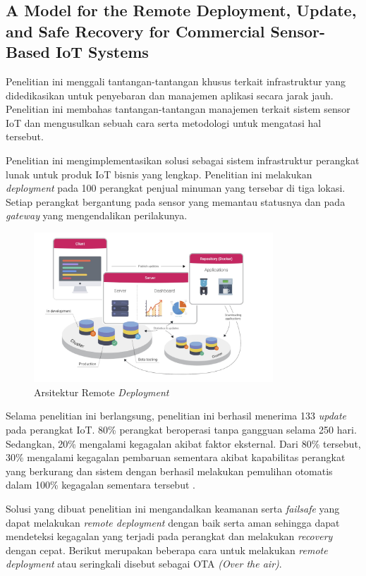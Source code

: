 \subsection{A Model for the Remote Deployment, Update, and Safe Recovery for Commercial Sensor-Based IoT Systems}
Penelitian ini menggali tantangan-tantangan khusus terkait infrastruktur yang didedikasikan untuk penyebaran dan manajemen aplikasi secara jarak jauh. Penelitian ini membahas tantangan-tantangan manajemen terkait sistem sensor IoT dan mengusulkan sebuah cara serta metodologi untuk mengatasi hal tersebut.

Penelitian ini mengimplementasikan solusi sebagai sistem infrastruktur perangkat lunak untuk produk IoT bisnis yang lengkap. Penelitian ini melakukan \textit{deployment} pada 100 perangkat penjual minuman yang tersebar di tiga lokasi. Setiap perangkat bergantung pada sensor yang memantau statusnya dan pada \textit{gateway} yang mengendalikan perilakunya.

\begin{figure}[ht]
  \centering
  \includegraphics[width=0.8\textwidth]{resources/chapter-2/arsitektur-remote-deployment.jpg}
  \caption{Arsitektur Remote \textit{Deployment} \parencite{RemoteDeployment}}
  \label{fig:architecture-remote-deployments}
\end{figure}

Selama penelitian ini berlangsung, penelitian ini berhasil menerima 133 \textit{update} pada perangkat IoT. 80\% perangkat beroperasi tanpa gangguan selama 250 hari. Sedangkan, 20\% mengalami kegagalan akibat faktor eksternal. Dari 80\% tersebut, 30\% mengalami kegagalan pembaruan sementara akibat kapabilitas perangkat yang berkurang dan sistem dengan berhasil melakukan pemulihan otomatis dalam 100\% kegagalan sementara tersebut \parencite{RemoteDeployment}.

Solusi yang dibuat penelitian ini mengandalkan keamanan serta \textit{failsafe} yang dapat melakukan \textit{remote deployment} dengan baik serta aman sehingga dapat mendeteksi kegagalan yang terjadi pada perangkat dan melakukan \textit{recovery} dengan cepat. Berikut merupakan beberapa cara untuk melakukan \textit{remote deployment} atau seringkali disebut sebagai OTA \textit{(Over the air)}.


